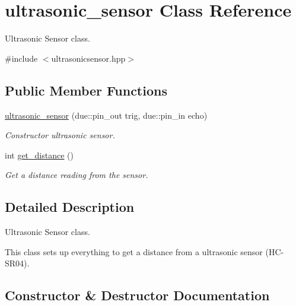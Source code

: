 \hypertarget{classultrasonic__sensor}{}\section{ultrasonic\+\_\+sensor Class Reference}
\label{classultrasonic__sensor}


Ultrasonic Sensor class.  




{\ttfamily \#include $<$ultrasonicsensor.\+hpp$>$}

\subsection*{Public Member Functions}
\begin{DoxyCompactItemize}
\item 
\hyperlink{classultrasonic__sensor_af394bc7e9ab31db01f37e08d7ee0f2eb}{ultrasonic\+\_\+sensor} (due\+::pin\+\_\+out trig, due\+::pin\+\_\+in echo)
\begin{DoxyCompactList}\small\item\em Constructor ultrasonic sensor. \end{DoxyCompactList}\item 
int \hyperlink{classultrasonic__sensor_a3365931510d22b8d887b2073fadf2a9d}{get\+\_\+distance} ()
\begin{DoxyCompactList}\small\item\em Get a distance reading from the sensor. \end{DoxyCompactList}\end{DoxyCompactItemize}


\subsection{Detailed Description}
Ultrasonic Sensor class. 

This class sets up everything to get a distance from a ultrasonic sensor (H\+C-\/\+S\+R04). 

\subsection{Constructor \& Destructor Documentation}
